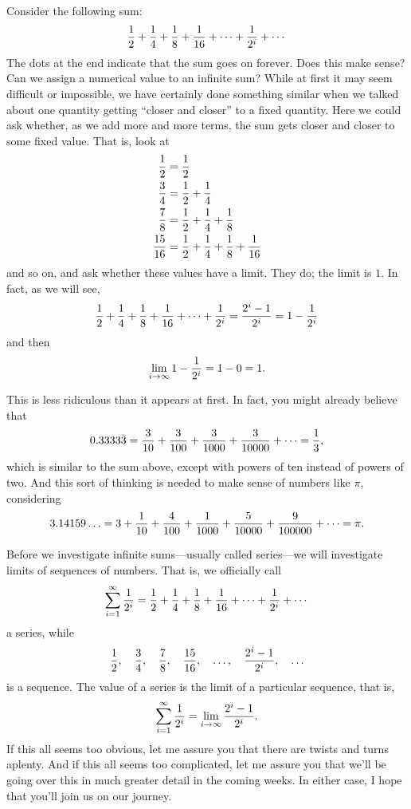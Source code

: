 Consider the following sum:
$${1\over2}+{1\over4}+{1\over8}+{1\over16}+\cdots+{1\over2^i}+\cdots$$
The dots at the end indicate that the sum goes on forever. Does this
make sense? Can we assign a numerical value to an infinite sum? While
at first it may seem difficult or impossible, we have certainly done
something similar when we talked about one quantity getting ``closer
and closer'' to a fixed quantity. Here we could ask whether, as we add
more and more terms, the sum gets closer and closer to some fixed
value. That is, look at
\begin{align*}
{1\over2}&={1\over2} \\
{3\over4}&={1\over2}+{1\over4} \\
{7\over8}&={1\over2}+{1\over4}+{1\over8} \\
{15\over16}&={1\over2}+{1\over4}+{1\over8}+{1\over16} \\
\end{align*}
and so on, and ask whether these values have a limit. They do; the limit is $1$. In fact, as we will see,
$${1\over2}+{1\over4}+{1\over8}+{1\over16}+\cdots+{1\over2^i}=
{2^i-1\over2^i}=1-{1\over2^i}$$
and then
$$\lim_{i\to\infty} 1-{1\over2^i}=1-0=1.$$

This is less ridiculous than it appears at first.  In fact, you might already believe that
$$0.3333\bar3 =
{3\over10}+{3\over100}+{3\over1000}+{3\over10000}+\cdots=
{1\over3},$$
which is similar to the sum above, except with powers of ten instead of powers of two.
And this sort of thinking is needed to make sense of numbers like $\pi$, considering
$$3.14159\ldots = 3+{1\over10}+{4\over100}+{1\over1000}+{5\over10000}+
{9\over100000}+\cdots = \pi.$$

Before we investigate infinite sums---usually called 
{\dfont series\/}---we will investigate limits of {\dfont
  sequences\/} of numbers. That is, we officially
call
$$\sum_{i=1}^\infty {1\over2^i}=
{1\over2}+{1\over4}+{1\over8}+{1\over16}+\cdots+{1\over2^i}+\cdots$$
a series, while
$${1\over2},\quad {3\over4},\quad {7\over8},\quad {15\over16},\quad \ldots,\quad {2^i-1\over2^i},\quad \ldots$$
is a sequence.  The value of a series is the limit of a particular sequence, that is,
$$\sum_{i=1}^\infty {1\over2^i}=\lim_{i\to\infty} {2^i-1\over2^i}.$$
If this all seems too obvious, let me assure you that there are twists and turns aplenty.  And if this all seems too complicated, let me assure you that we'll be going over this in much greater detail in the coming weeks. In either case, I hope that you'll join us on our journey.
